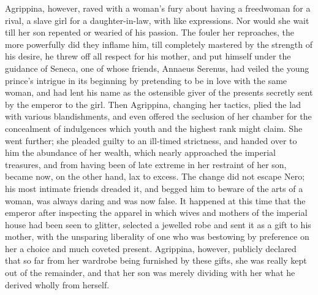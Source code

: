 Agrippina, however, raved with a woman's fury about having a freedwoman for a rival, a slave girl for a daughter-in-law, with like expressions. Nor would she wait till her son repented or wearied of his passion. The fouler her reproaches, the more powerfully did they inflame him, till completely mastered by the strength of his desire, he threw off all respect for his mother, and put himself under the guidance of Seneca, one of whose friends, Annaeus Serenus, had veiled the young prince's intrigue in its beginning by pretending to be in love with the same woman, and had lent his name as the ostensible giver of the presents secretly sent by the emperor to the girl. Then Agrippina, changing her tactics, plied the lad with various blandishments, and even offered the seclusion of her chamber for the concealment of indulgences which youth and the highest rank might claim. She went further; she pleaded guilty to an ill-timed strictness, and handed over to him the abundance of her wealth, which nearly approached the imperial treasures, and from having been of late extreme in her restraint of her son, became now, on the other hand, lax to excess. The change did not escape Nero; his most intimate friends dreaded it, and begged him to beware of the arts of a woman, was always daring and was now false. It happened at this time that the emperor after inspecting the apparel in which wives and mothers of the imperial house had been seen to glitter, selected a jewelled robe and sent it as a gift to his mother, with the unsparing liberality of one who was bestowing by preference on her a choice and much coveted present. Agrippina, however, publicly declared that so far from her wardrobe being furnished by these gifts, she was really kept out of the remainder, and that her son was merely dividing with her what he derived wholly from herself.


